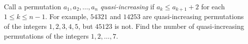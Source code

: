 Call a permutation $a_1,a_2,\ldots,a_n$ \textit{quasi-increasing} if $a_k\le a_{k+1}+2$ for each $1\le k\le n-1$. For example, $54321$ and $14253$ are quasi-increasing permutations of the integers $1,2,3,4,5$, but $45123$ is not. Find the number of quasi-increasing permutations of the integers $1,2,\ldots,7$.